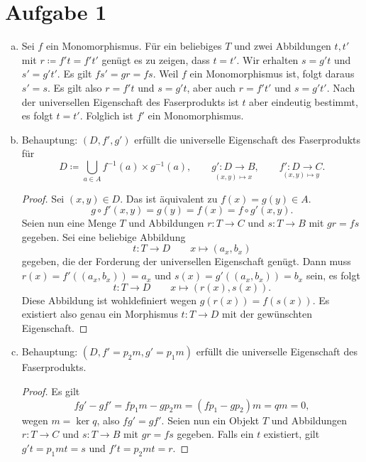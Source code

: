 \documentclass{article}
\begin{document}
\section*{Aufgabe 1}
\begin{enumerate}[(a)]
    \item Sei $f$ ein Monomorphismus. Für ein beliebiges $T$ und zwei Abbildungen $t, t'$ mit $r \coloneqq f't = f't'$ genügt es zu zeigen, dass $t = t'$.
          Wir erhalten $s = g't$ und $s' = g't'$. Es gilt $fs' = gr = fs$. Weil $f$ ein Monomorphismus ist, folgt daraus $s' = s$.
          Es gilt also $r = f't$ und $s= g't$, aber auch $r = f't'$ und $s = g't'$. Nach der universellen Eigenschaft des Faserprodukts
          ist $t$ aber eindeutig bestimmt, es folgt $t = t'$.
          Folglich ist $f'$ ein Monomorphismus.
    \item Behauptung: $(D, f', g')$ erfüllt die universelle Eigenschaft des Faserprodukts für
          $$D \coloneqq \bigcup_{a\in A} f^{-1}(a)\times g^{-1}(a), \qquad
              \underset{(x,y) \mapsto x}{g'\colon D \to B}, \qquad
              \underset{(x,y) \mapsto y}{f'\colon D \to C}.$$
          \begin{proof}
              Sei $(x,y) \in D$. Das ist äquivalent zu $f(x) = g(y) \in A$.
              \[
                  g\circ f' (x,y) = g(y) = f(x) = f \circ g' (x,y).
              \]
              Seien nun eine Menge $T$ und Abbildungen $r \colon T \to C$ und $s\colon T \to B$ mit $gr = fs$ gegeben.
              Sei eine beliebige Abbildung $$t \colon T \to D\qquad x \mapsto (a_x,b_x)$$ gegeben,
              die der Forderung der universellen Eigenschaft genügt.
              Dann muss $r(x) = f'((a_x,b_x)) = a_x$ und $s(x) = g'((a_x,b_x)) = b_x$ sein, es folgt
              $$t \colon T \to D\qquad x\mapsto (r(x), s(x)).$$
              Diese Abbildung ist wohldefiniert wegen $g(r(x)) = f(s(x))$.
              Es existiert also genau ein Morphismus $t\colon T \to D$ mit der gewünschten Eigenschaft.
          \end{proof}
    \item Behauptung: $(D, f'=p_2m, g'=p_1m)$ erfüllt die universelle Eigenschaft des Faserprodukts.
          \begin{proof}
              Es gilt
              \[
                  fg' - gf' = fp_1m - gp_2m  = (fp_1 - gp_2) m = qm = 0,
              \]
              wegen $m = \ker q$, also $fg' = gf'$.
              Seien nun ein Objekt $T$ und Abbildungen $r \colon T \to C$ und $s\colon T \to B$ mit $gr = fs$ gegeben.
              Falls ein $t$ existiert, gilt $g't = p_1mt = s$ und $f't = p_2mt = r$.

\end{proof}
\end{enumerate}
\end{document}
